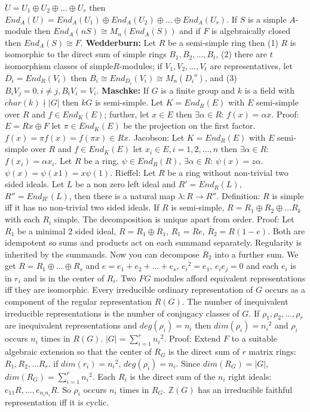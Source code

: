 $U= U_1 \oplus U_2 \oplus \ldots \oplus U_r$ then
$End_A(U)= End_A(U_1) \oplus End_A(U_2) \oplus \ldots \oplus End_A(U_r)$.  If
$S$ is a simple $A$-module then $End_A(nS) \cong M_n(End_A(S))$ and
if $F$ is algebraically closed then $End_A(S) \cong F$.
{\bf Wedderburn:}  Let $R$ be a semi-simple ring then 
(1) $R$ is isomorphic to the direct sum
of simple rings $B_1 , B_2 , \ldots , B_t$, (2) there are $t$ isomorphism classes
of simple$R$-modules; if $V_1 , V_2 , \ldots , V_t$ are representatives, let
$D_i=End_R(V_i)$ then $B_i \cong End_{D_i}(V_i) \cong M_n({D_i}^o)$, and
(3) $B_i V_j=0, i \ne j, B_i V_i = V_i$.  {\bf Maschke:}  If $G$ is a finite group and
$k$ is a field with $char(k) \nmid |G|$ then $kG$ is semi-simple.
Let $K=End_R(E)$ with $E$ semi-simple over $R$ and $f \in End_K(E)$; further,
let $x \in E$ then
$\exists \alpha \in R$: $f(x) = \alpha x$.  Proof: $E= Rx \oplus F$ let $\pi \in End_K(E)$
be the projection on the first factor.  $f(x)= \pi f(x) = f( \pi x) \in Rx$.
Jacobson: Let $K=End_R(E)$ with $E$ semi-simple over $R$ and $f \in End_K(E)$ let 
$x_i \in E, i= 1,2, \ldots, n$ then
$\exists \alpha \in R$: $f(x_i) = \alpha x_i$.
Let $R$ be a ring, $\psi \in End_R(R)$, $\exists \alpha \in R$: $\psi (x)= z \alpha$.
$\psi(x)= \psi(x1)= x \psi(1)$.
Rieffel:  Let $R$ be a ring without non-trivial two sided ideals.  Let $L$ be a non
zero left ideal and $R'=End_R(L)$, $R''=End_{R'}(L)$, then there is a natural map
$\lambda: R \rightarrow R''$.
Definition: $R$ is simple iff it has no non-trivial two sided ideals.
If $R$ is semi-simple, $R= R_1 \oplus R_2 \oplus \ldots R_k$ with each $R_i$
simple.  The decomposition is unique apart from order.
Proof:
Let $R_1$ be a minimal 2 sided ideal, $R= R_1 \oplus {\overline R_1}$,
$R_1= Re$, ${\overline R_2} = R(1-e)$.  Both are idempotent so sums and
products act on each summand separately.  Regularity is inherited by
the summands.  Now you can decompose ${\overline R_2}$ into a further sum.
We get $R= R_1 \oplus \ldots \oplus R_s$ and
$e= e_1 + e_2 + \ldots + e_s$, ${e_i}^2=e_1$, $e_i e_j =0$ and each $e_i$ is
in
$r_i$ and is in the center of $R_i$.
Two $FG$ modules afford equivalent representations iff they are isomorphic.  
Every irreducible ordinary representation of $G$ occurs as a component of
the regular representation $R(G)$.  The number of inequivalent irreducible
representations is the number of conjugacy classes of $G$.  If $\rho_1 ,
\rho_2 , \ldots , \rho_r$ are inequivalent representations and
$deg(\rho_i )= n_i$ then $dim(\rho_i ) = {n_i}^2$ and $\rho_i$ occurs
$n_i$ times in $R(G)$.  $|G|= \sum_{i=1}^r {n_i}^2$.
Proof:  Extend $F$ to a suitable algebraic extension so that the
center of $R_G$ is the direct sum of $r$ matrix rings: $R_1 , R_2 , \ldots
R_r$.
if $dim(r_i)= {n_i}^2$, $deg(\rho_i)= n_i$.  Since $dim(R_G)= |G|$,
$dim(R_G)= \sum_{i=1}^r {n_i}^2$.  Each $R_i$ is the direct sum of the
$n_i$ right ideals: $e_{11}R, \ldots , e_{{n_i}{n_i}}R$.  So $\rho_i$
occurs $n_i$ times in $R_G$. 
${\mathbb Z}(G)$ has an irreducible faithful representation iff it is cyclic.\\
\\
